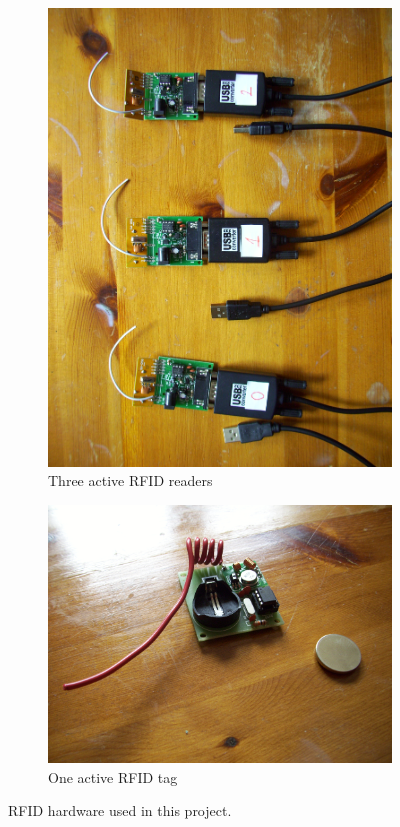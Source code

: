 \begin{figure}[h]
	\begin{subfigure}[b]{0.5\textwidth}
		\includegraphics[width=\textwidth]{figures/readers}
		\caption{Three active RFID readers}
		\label{fig:projread}
	\end{subfigure}
	\begin{subfigure}[b]{0.5\textwidth}
		\includegraphics[width=\textwidth]{figures/tag}
		\caption{One active RFID tag}
		\label{fig:tag}
	\end{subfigure}
	\caption{RFID hardware used in this project.}
	\label{fig:projrfid}
\end{figure}


